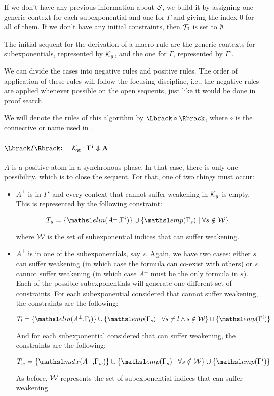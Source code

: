 If we don't have any previous information about $\mathcal{S}$, we build it by
assigning one generic context for each subexponential and one for $\Gamma$ and
giving the index 0 for all of them. If we don't have any initial constraints,
then $\mathcal{T}_0$ is set to $\emptyset$.

The initial sequent for the derivation of a macro-rule are the generic contexts
for subexponentials, represented by $\mathcal{K}_{g}$, and the one for $\Gamma$,
represented by $\Gamma^i$.

We can divide the cases into negative rules and positive
rules. The order of application of these rules will follow the focusing
discipline, i.e., the negative rules are applied whenever possible on the open
sequents, just like it would be done in proof search.

We will denote the rules of this algorithm by $\alg{\circ}$, where $\circ$ is
the connective or name used in \sellf.

\paragraph{$\alg{I}$: $\mathbf{\vdash \mathcal{K}_{g} : \Gamma^i \Downarrow A}$\\} 
$A$ is a positive atom in a
synchronous phase. In that case, there is only one possibility, which is to
close the sequent. For that, one of two things must occur:
\begin{itemize}
  \item $A^{\bot}$ is in $\Gamma^i$ and every context that cannot suffer
  weakening in $\mathcal{K}_{g}$ is empty. This is represented by the following
  constraint:

  $$T_u = \{\elin{A^{\bot}}{\Gamma^i}\} \cup \{ \emp{\Gamma_s} \mid \forall s
  \notin \Wscr\} $$

  where $\mathcal{W}$ is the set of subexponential indices that can suffer weakening. 

  \item $A^{\bot}$ is in one of the subexponentials, say $s$. Again, we have two cases:
  either $s$ can suffer weakening (in which case the formula can co-exist with
  others) or $s$ cannot suffer weakening (in which case $A^{\bot}$ must be the
  only formula in $s$). Each of the possible subexponentials will generate one different
  set of constraints. For each subexponential considered that cannot suffer weakening, the
  constraints are the following:

  $$T_l = \{\elin{A^{\bot}}{\Gamma_l} \} \cup \{ \emp{\Gamma_s} \mid \forall s
  \neq l \wedge s \notin \Wscr \} \cup \{ \emp{\Gamma^i} \}$$

  And for each subexponential considered that can suffer weakening, the
  constraints are the following:  

  $$T_w = \{\mctx{A^{\bot}}{\Gamma_w} \} \cup \{ \emp{\Gamma_s} \mid \forall s
  \notin \Wscr \} \cup \{ \emp{\Gamma^i} \}$$

  As before, $\mathcal{W}$ represents the set of subexponential indices that can
  suffer weakening.
\end{itemize}

